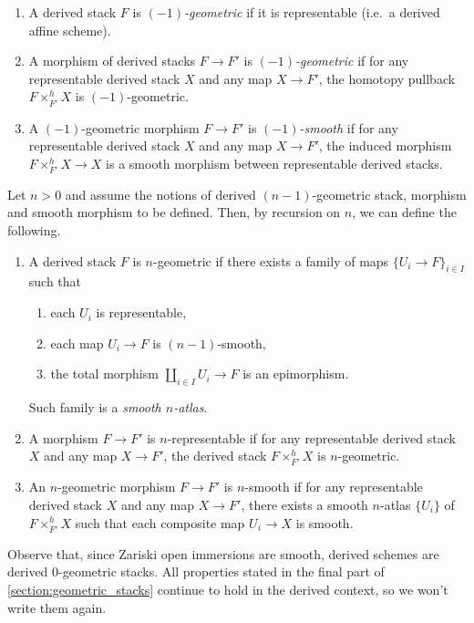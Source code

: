         \pagebreak
        \begin{defn}\hfill
            \label{defn:algebraic_derived_stacks}
            \begin{enumerate}
                \item A derived stack $F$ is \emph{$(-1)$-geometric} if it is representable (i.e.\ a derived affine scheme).
                \item A morphism of derived stacks $F \to F'$ is \emph{$(-1)$-geometric} if for any representable derived stack $X$ and any map $X \to F'$, the homotopy pullback $F \times^h_{F'} X$ is $(-1)$-geometric.
                \item A $(-1)$-geometric morphism $F \to F'$ is \emph{$(-1)$-smooth} if for any representable derived stack $X$ and any map $X \to F'$, the induced morphism $F \times^h_{F'} X \to X$ is a smooth morphism between representable derived stacks.
            \end{enumerate}
            Let $n > 0$ and assume the notions of derived $(n-1)$-geometric stack, morphism and smooth morphism to be defined. Then, by recursion on $n$, we can define the following.
            \begin{enumerate}
                \item A derived stack $F$ is $n$-geometric if there exists a family of maps $\{U_i \to F\}_{i \in I}$ such that 
                \begin{enumerate}[label=(\alph*)]
                    \item each $U_i$ is representable,
                    \item each map $U_i \to F$ is $(n-1)$-smooth,
                    \item the total morphism $\coprod_{i \in I} U_i \to F$ is an epimorphism.
                \end{enumerate}
                Such family is a \emph{smooth $n$-atlas}.
                \item A morphism $F \to F'$ is $n$-representable if for any representable derived stack $X$ and any map $X \to F'$, the derived stack $F \times^h_{F'} X$ is $n$-geometric.
                \item An $n$-geometric morphism $F \to F'$ is $n$-smooth if for any representable derived stack $X$ and any map $X \to F'$, there exists a smooth $n$-atlas $\{U_i\}$ of $F \times^h_{F'} X$ such that each composite map $U_i \to X$ is smooth.
            \end{enumerate}
        \end{defn}
        Observe that, since Zariski open immersions are smooth, derived schemes are derived $0$-geometric stacks.
        All properties stated in the final part of \cref{section:geometric_stacks} continue to hold in the derived context, so we won't write them again.
